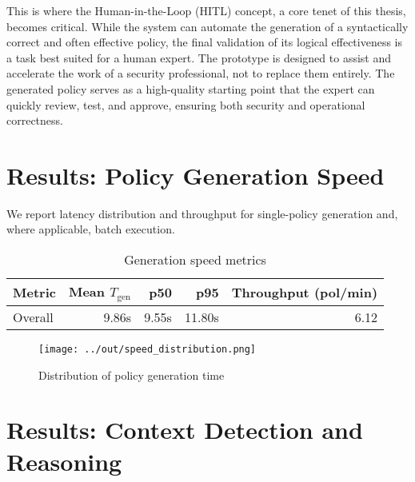This is where the Human-in-the-Loop (HITL) concept, a core tenet of this thesis, becomes critical. While the system can automate the generation of a syntactically correct and often effective policy, the final validation of its logical effectiveness is a task best suited for a human expert. The prototype is designed to assist and accelerate the work of a security professional, not to replace them entirely. The generated policy serves as a high-quality starting point that the expert can quickly review, test, and approve, ensuring both security and operational correctness.

\section{Results: Policy Generation Speed}\label{sec:results-speed}


We report latency distribution and throughput for single-policy generation and, where applicable, batch execution.

\begin{table}[htbp]
	\centering
		\caption{Generation speed metrics}\label{tab:speed-metrics}
	\begin{tabular}{lrrrr}
		\hline
		Metric & Mean $T_{\text{gen}}$ & p50 & p95 & Throughput (pol/min) \\
		\hline
		Overall & 9.86s & 9.55s & 11.80s & 6.12 \\
		\hline
	\end{tabular}
\end{table}

\begin{figure}[htbp]
	\centering
	\texttt{[image: ../out/speed\_distribution.png]}
	\caption{Distribution of policy generation time}\label{fig:speed-distribution}
\end{figure}

\section{Results: Context Detection and Reasoning}\label{sec:results-context}

